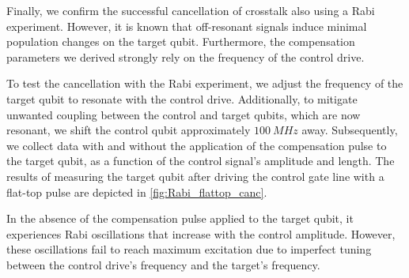 Finally, we confirm the successful cancellation of crosstalk also using a Rabi experiment. 
However, it is known that off-resonant signals induce minimal population changes on the target qubit. 
Furthermore, the compensation parameters we derived strongly rely on the frequency of the control drive.

To test the cancellation with the Rabi experiment, we adjust the frequency of the target qubit to resonate with the control drive. 
Additionally, to mitigate unwanted coupling between the control and target qubits, which are now resonant, we shift the control qubit approximately $\SI{100}{MHz}$ away. 
Subsequently, we collect data with and without the application of the compensation pulse to the target qubit, as a function of the control signal's amplitude and length.
The results of measuring the target qubit after driving the control gate line with a flat-top pulse are depicted in \cref{fig:Rabi_flattop_canc}.

In the absence of the compensation pulse applied to the target qubit, it experiences Rabi oscillations that increase with the control amplitude.
However, these oscillations fail to reach maximum excitation due to imperfect tuning between the control drive's frequency and the target's frequency.


